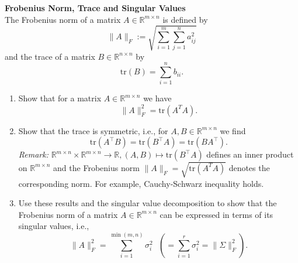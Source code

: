 \textbf{Frobenius Norm, Trace and Singular Values}\\
The Frobenius norm of a matrix $A  \in \mathbb{R}^{m \times n}$ is defined by 
$$\|A\|_F := \sqrt{\sum_{i=1}^m \sum_{j=1}^n a_{ij}^2} $$ and the trace of a matrix $B \in \mathbb{R}^{n \times n}$ by
$$ \text{tr}(B) = \sum_{i=1}^n b_{ii}.$$
\begin{enumerate}
	\item Show that for a matrix $A  \in \mathbb{R}^{m \times n}$ we have $$\|A\|_F^2 = \text{tr}(A^TA).$$
	\item Show that the trace is symmetric, i.e., for $A,B \in \mathbb{R}^{m \times n}$ we find $$\text{tr}(A^\top B)=  \text{tr}(B^\top A ) = \text{tr}(BA^\top ) .$$
	{\color{navy}\textit{Remark:} $\mathbb{R}^{m \times n} \times \mathbb{R}^{m \times n} \to \mathbb{R}, (A,B) \mapsto \text{tr}(B^\top A)$ defines an inner product on $\mathbb{R}^{m \times n}$ and the Frobenius norm $\|A\|_F  = \sqrt{\text{tr}(A^TA)}$ denotes the corresponding norm. For example, Cauchy-Schwarz inequality holds.}
	\item Use these results and the singular value decomposition to show that the Frobenius norm of a matrix $A \in \mathbb{R}^{m \times n}$ can be expressed in terms of its singular values, i.e., $$\|A\|_F^2 = \sum_{i=1}^{\min(m,n)} \sigma_i^2 ~~~\left(= \sum_{i=1}^{r} \sigma_i^2 = \|\Sigma\|^2_F\right).$$
\end{enumerate}
